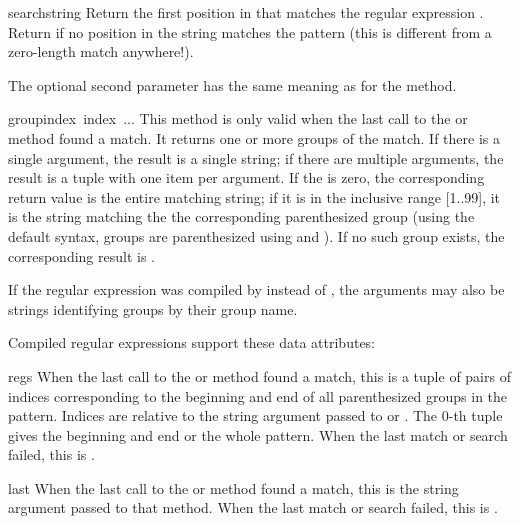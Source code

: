 \begin{funcdesc}{search}{string}
  Return the first position in  that matches the regular
  expression .  Return  if no position in the
  string matches the pattern (this is different from a zero-length
  match anywhere!).
  
  The optional second parameter has the same meaning as for the
   method.
\end{funcdesc}

\begin{funcdesc}{group}{index\, index\, ...}
This method is only valid when the last call to the 
or  method found a match.  It returns one or more
groups of the match.  If there is a single  argument,
the result is a single string; if there are multiple arguments, the
result is a tuple with one item per argument.  If the  is
zero, the corresponding return value is the entire matching string; if
it is in the inclusive range [1..99], it is the string matching the
the corresponding parenthesized group (using the default syntax,
groups are parenthesized using \code{\\(} and \code{\\)}).  If no
such group exists, the corresponding result is .

If the regular expression was compiled by  instead of
, the  arguments may also be strings
identifying groups by their group name.
\end{funcdesc}

\noindent
Compiled regular expressions support these data attributes:

\renewcommand{\indexsubitem}{(regex attribute)}

\begin{datadesc}{regs}
When the last call to the  or  method found a
match, this is a tuple of pairs of indices corresponding to the
beginning and end of all parenthesized groups in the pattern.  Indices
are relative to the string argument passed to  or
.  The 0-th tuple gives the beginning and end or the
whole pattern.  When the last match or search failed, this is
.
\end{datadesc}

\begin{datadesc}{last}
When the last call to the  or  method found a
match, this is the string argument passed to that method.  When the
last match or search failed, this is .
\end{datadesc}

